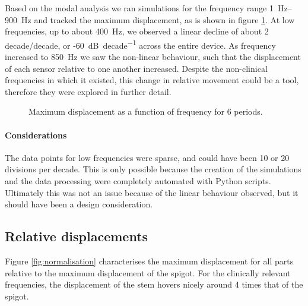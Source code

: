 Based on the modal analysis we ran simulations for the frequency range \SIrange{1}{900}{Hz} and tracked the maximum displacement, as is shown in figure \ref{fig:max-displacement-6}.
At low frequencies, up to about \SI{400}{Hz}, we observed a linear decline of about 2 decade/decade, or -\SI{60}{\deci\bel\per decade} across the entire device.
As frequency increased to \SI{850}{Hz} we saw the non-linear behaviour, such that the displacement of each sensor relative to one another increased.
Despite the non-clinical frequencies in which it existed, this change in relative movement could be a tool, therefore they were explored in further detail.

\begin{figure}[h]\centering

\caption{Maximum displacement as a function of frequency for 6 periods.}
\label{fig:max-displacement-6}
\end{figure}

\paragraph{Considerations}
The data points for low frequencies were sparse, and could have been 10 or 20 divisions per decade.
This is only possible because the creation of the simulations and the data processing were completely automated with Python scripts.
Ultimately this was not an issue because of the linear behaviour observed, but it should have been a design consideration.

\subsection{Relative displacements}
Figure \ref{fig:normalisation} characterises the maximum displacement for all parts relative to the maximum displacement of the spigot.
For the clinically relevant frequencies, the displacement of the stem hovers nicely around 4 times that of the spigot. 

